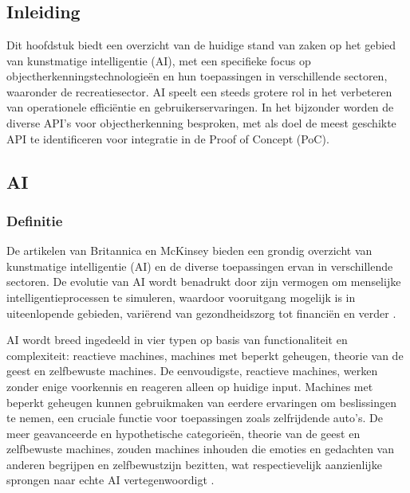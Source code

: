 \chapter{}%
\label{ch:stand-van-zaken}



\section{Inleiding}

Dit hoofdstuk biedt een overzicht van de huidige stand van zaken op het gebied van kunstmatige intelligentie (AI), met een specifieke focus op objectherkenningstechnologieën en hun toepassingen in verschillende sectoren, waaronder de recreatiesector. AI speelt een steeds grotere rol in het verbeteren van operationele efficiëntie en gebruikerservaringen. In het bijzonder worden de diverse API's voor objectherkenning besproken, met als doel de meest geschikte API te identificeren voor integratie in de Proof of Concept (PoC).



\section{AI}
\subsection{Definitie}

De artikelen van Britannica en McKinsey bieden een grondig overzicht van kunstmatige intelligentie (AI) en de diverse toepassingen ervan in verschillende sectoren. De evolutie van AI wordt benadrukt door zijn vermogen om menselijke intelligentieprocessen te simuleren, waardoor vooruitgang mogelijk is in uiteenlopende gebieden, variërend van gezondheidszorg tot financiën en verder \autocite{mckinseyAI}\autocite{britannicaAI}.

AI wordt breed ingedeeld in vier typen op basis van functionaliteit en complexiteit: reactieve machines, machines met beperkt geheugen, theorie van de geest en zelfbewuste machines. De eenvoudigste, reactieve machines, werken zonder enige voorkennis en reageren alleen op huidige input. Machines met beperkt geheugen kunnen gebruikmaken van eerdere ervaringen om beslissingen te nemen, een cruciale functie voor toepassingen zoals zelfrijdende auto's. De meer geavanceerde en hypothetische categorieën, theorie van de geest en zelfbewuste machines, zouden machines inhouden die emoties en gedachten van anderen begrijpen en zelfbewustzijn bezitten, wat respectievelijk aanzienlijke sprongen naar echte AI vertegenwoordigt \autocite{courseraAI}.


